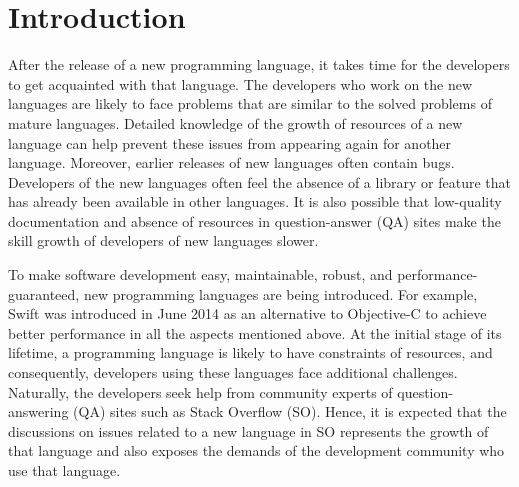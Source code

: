 \section{Introduction}
\label{sec:introduction}
After the release of a new programming language, it takes time for the developers to get acquainted with that language. The developers who work on the new languages are likely to face problems that are similar to the solved problems of mature languages. Detailed knowledge of the growth of resources of a new language can help prevent these issues from appearing again for another language. Moreover, earlier releases of new languages often contain bugs. Developers of the new languages often feel the absence of a library or feature that has already been available in other languages. It is also possible that low-quality documentation and absence of resources in question-answer (QA) sites make the skill growth of developers of new languages slower.

\iffalse
To better help developers of new languages, it is imperative to know how the resources of a language build up in QA site, the impact of language bug in software development and the effects of the absence of a feature. The quality of the support provided in the early stages plays a pivotal role in the acceptance of the language. Despite that, we often notice the absence of quality support for new languages in starting years. To fill the gap in support, language owners can offer extensive support period for new languages, but this is not the only factor contributing to the growth of languages. Identification of all the factors contributing to the growth of language may help to build a collaborative model to support the growth of new languages. In addition to helping the developers, this type of study will help language designers in selecting features, designing documentation and also determining extending support period for developers.
\fi 

To make software development easy, maintainable, robust, and performance-guaranteed, new programming languages are being introduced. For example, Swift was introduced in June 2014 as an alternative to Objective-C to achieve better performance in all the aspects mentioned above. At the initial stage of its lifetime, a programming language is likely to have constraints of resources, and consequently, developers using these languages face additional challenges. Naturally, the developers seek help from community experts of question-answering (QA) sites such as Stack Overflow (SO). Hence, it is expected that the discussions on issues related to a new language in SO represents the growth of that language and also exposes the demands of the development community who use that language. 

